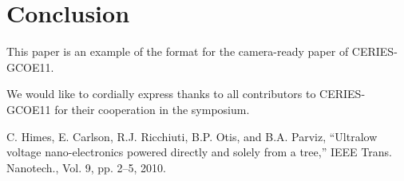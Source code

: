 \documentclass[10pt]{article}
\begin{document}
\section{Conclusion}

This paper is an example of the format for the camera-ready
paper of CERIES-GCOE11.


\acknowledgment
We would like to cordially express thanks to all
contributors to CERIES-GCOE11 for their cooperation in the
symposium.


\begin{thebibliography}{99}
 C. Himes, E. Carlson, R.J. Ricchiuti,
  B.P. Otis, and B.A. Parviz,
  ``Ultralow voltage nano-electronics powered directly and
  solely from a tree,''
  IEEE Trans. Nanotech., Vol. 9, pp. 2--5, 2010.
\end{thebibliography}
\end{document}
